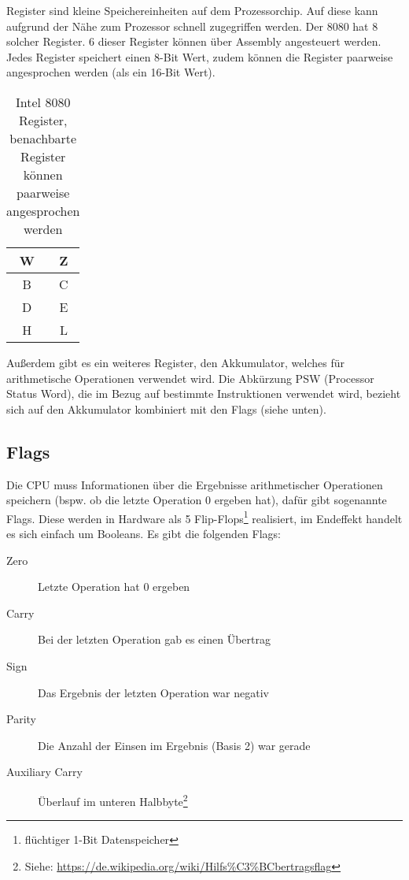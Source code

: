 Register sind kleine Speichereinheiten auf dem Prozessorchip. Auf diese kann aufgrund der Nähe zum Prozessor schnell zugegriffen werden. Der 8080 hat 8 solcher Register.
6 dieser Register können über Assembly angesteuert werden. Jedes Register speichert einen 8-Bit Wert, zudem können die Register paarweise angesprochen werden (als ein 16-Bit Wert).

\begin{table}[h]
    \centering
    \caption{Intel 8080 Register, benachbarte Register können paarweise angesprochen werden}
    \label{tab:regs}
    \begin{tabular}{|c|c|}
        \hline
        W & Z \\\hline
        B & C \\\hline
        D & E \\\hline
        H & L \\\hline
    \end{tabular}
\end{table}

Außerdem gibt es ein weiteres Register, den Akkumulator, welches für arithmetische Operationen verwendet wird.
Die Abkürzung PSW (Processor Status Word), die im Bezug auf bestimmte Instruktionen verwendet wird, bezieht sich auf den Akkumulator kombiniert mit den Flags (siehe unten).

\subsection{Flags}\label{sec:flags}

Die CPU muss Informationen über die Ergebnisse arithmetischer Operationen speichern (bspw. ob die letzte Operation 0 ergeben hat), dafür gibt sogenannte Flags. Diese werden in Hardware als 5 Flip-Flops\footnote{flüchtiger 1-Bit Datenspeicher} realisiert, im Endeffekt handelt es sich einfach um Booleans. Es gibt die folgenden Flags:

\begin{description}
    \item[Zero] Letzte Operation hat 0 ergeben
    \item[Carry] Bei der letzten Operation gab es einen Übertrag
    \item[Sign] Das Ergebnis der letzten Operation war negativ
    \item[Parity] Die Anzahl der Einsen im Ergebnis (Basis 2) war gerade
    \item[Auxiliary Carry] Überlauf im unteren Halbbyte\footnote{Siehe: \url{https://de.wikipedia.org/wiki/Hilfs\%C3\%BCbertragsflag}}
\end{description}

